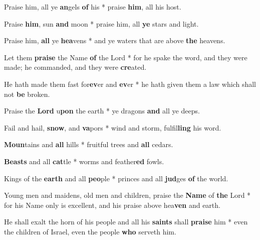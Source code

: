 \begin{multicols}{2}
	Praise him, all ye \textbf{an}gels \textbf{of} his * praise \textbf{him}, all his host.
	
	Praise \textbf{him}, sun \textbf{and} moon * praise him, all \textbf{ye} stars and light.
	
	Praise him, \textbf{all} ye \textbf{hea}vens * and ye waters that are above \textbf{the} heavens.
	
	Let them \textbf{praise} the Name \textbf{of} the Lord * for he spake the word, and they were made; he commanded, and they were \textbf{cre}ated.
	
	He hath made them fast for\textbf{ev}er and \textbf{ev}er * he hath given them a law which shall not \textbf{be} broken.
	
	Praise the \textbf{Lord} u\textbf{pon} the earth * ye dragons \textbf{and} all ye deeps.
	
	Fail and hail, \textbf{snow}, and \textbf{va}pors * wind and storm, fulfil\textbf{ling} his word.
	
	\textbf{Moun}tains and \textbf{all} hills * fruitful trees and \textbf{all} cedars.
	
	\textbf{Beasts} and all \textbf{cat}tle * worms and feather\textbf{ed} fowls.
	
	Kings of the \textbf{earth} and all \textbf{peo}ple * princes and all \textbf{jud}ges \textbf{of} the world.
	
	Young men and maidens, old men and children, praise the \textbf{Name} of \textbf{the} Lord * for his Name only is excellent, and his praise above hea\textbf{ven} and earth.
	
	He shall exalt the horn of his people and all his \textbf{saints} shall \textbf{praise} him * even the children of Israel, even the people \textbf{who} serveth him.
\end{multicols}